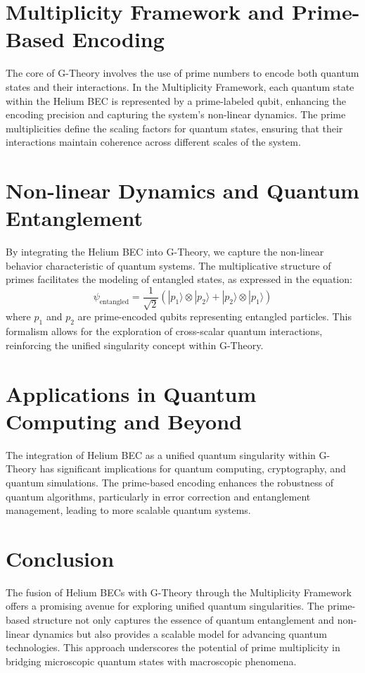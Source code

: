\documentclass[%
 preprint, linenumbers,
 amsmath,amssymb,
 aps, physrev,
]{revtex4-2}
\begin{document}
\section{Multiplicity Framework and Prime-Based Encoding}

The core of G-Theory involves the use of prime numbers to encode both quantum states and their interactions. In the Multiplicity Framework, each quantum state within the Helium BEC is represented by a prime-labeled qubit, enhancing the encoding precision and capturing the system's non-linear dynamics. The prime multiplicities define the scaling factors for quantum states, ensuring that their interactions maintain coherence across different scales of the system.

\section{Non-linear Dynamics and Quantum Entanglement}

By integrating the Helium BEC into G-Theory, we capture the non-linear behavior characteristic of quantum systems. The multiplicative structure of primes facilitates the modeling of entangled states, as expressed in the equation:
\[
\psi_{\text{entangled}} = \frac{1}{\sqrt{2}} (| p_1 \rangle \otimes | p_2 \rangle + | p_2 \rangle \otimes | p_1 \rangle)
\]
where \( p_1 \) and \( p_2 \) are prime-encoded qubits representing entangled particles. This formalism allows for the exploration of cross-scalar quantum interactions, reinforcing the unified singularity concept within G-Theory.

\section{Applications in Quantum Computing and Beyond}

The integration of Helium BEC as a unified quantum singularity within G-Theory has significant implications for quantum computing, cryptography, and quantum simulations. The prime-based encoding enhances the robustness of quantum algorithms, particularly in error correction and entanglement management, leading to more scalable quantum systems.

\section{Conclusion}

The fusion of Helium BECs with G-Theory through the Multiplicity Framework offers a promising avenue for exploring unified quantum singularities. The prime-based structure not only captures the essence of quantum entanglement and non-linear dynamics but also provides a scalable model for advancing quantum technologies. This approach underscores the potential of prime multiplicity in bridging microscopic quantum states with macroscopic phenomena.
\end{document}
